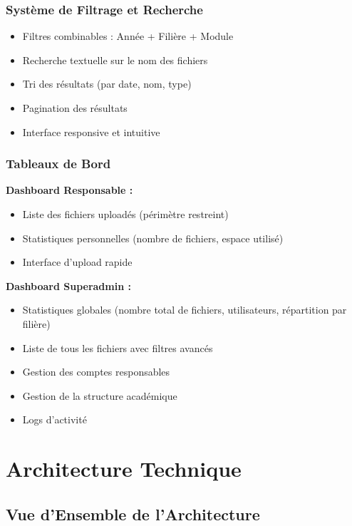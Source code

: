 \documentclass[12pt,a4paper]{article}
\begin{document}
\subsubsection{Système de Filtrage et Recherche}

\begin{itemize}[leftmargin=*]
    \item Filtres combinables : Année + Filière + Module
    \item Recherche textuelle sur le nom des fichiers
    \item Tri des résultats (par date, nom, type)
    \item Pagination des résultats
    \item Interface responsive et intuitive
\end{itemize}

\subsubsection{Tableaux de Bord}

\textbf{Dashboard Responsable :}
\begin{itemize}[leftmargin=*]
    \item Liste des fichiers uploadés (périmètre restreint)
    \item Statistiques personnelles (nombre de fichiers, espace utilisé)
    \item Interface d'upload rapide
\end{itemize}

\textbf{Dashboard Superadmin :}
\begin{itemize}[leftmargin=*]
    \item Statistiques globales (nombre total de fichiers, utilisateurs, répartition par filière)
    \item Liste de tous les fichiers avec filtres avancés
    \item Gestion des comptes responsables
    \item Gestion de la structure académique
    \item Logs d'activité
\end{itemize}

\section{Architecture Technique}

\subsection{Vue d'Ensemble de l'Architecture}
\end{document}
